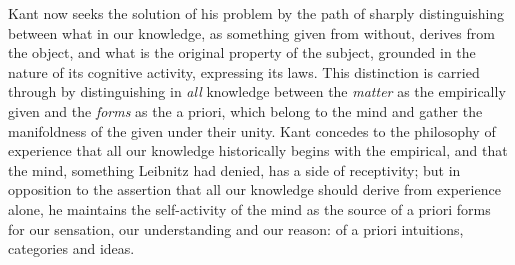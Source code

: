 Kant now seeks the solution of his problem by the path of sharply
distinguishing between what in our knowledge, as something given from
without, derives from the object, and what is the original property of
the subject, grounded in the nature of its cognitive activity,
expressing its laws. This distinction is carried through by
distinguishing in \emph{all} knowledge between the \emph{matter} as the
empirically given and the \emph{forms} as the a priori, which belong to
the mind and gather the manifoldness of the given under their unity.
Kant concedes to the philosophy of experience that all our knowledge
historically begins with the empirical, and that the mind, something
Leibnitz had denied, has a side of receptivity; but in opposition to
the assertion that all our knowledge should derive from experience
alone, he maintains the self-activity of the mind as the source of a
priori forms for our sensation, our understanding and our reason: of a
priori intuitions, categories and ideas.

\divrule

